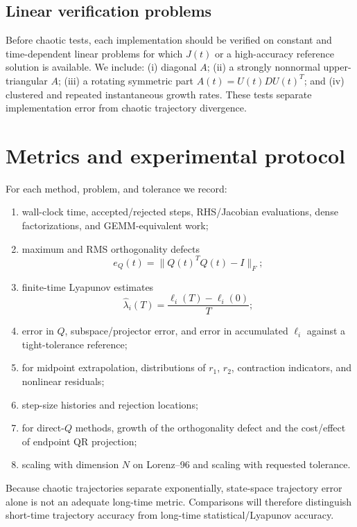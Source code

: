 \documentclass[11pt]{article}
\begin{document}
\subsection{Linear verification problems}
Before chaotic tests, each implementation should be verified on constant and time-dependent linear problems for which $J(t)$ or a high-accuracy reference solution is available. We include: (i) diagonal $A$; (ii) a strongly nonnormal upper-triangular $A$; (iii) a rotating symmetric part $A(t)=U(t)DU(t)^T$; and (iv) clustered and repeated instantaneous growth rates. These tests separate implementation error from chaotic trajectory divergence.

\section{Metrics and experimental protocol}
For each method, problem, and tolerance we record:
\begin{enumerate}
 \item wall-clock time, accepted/rejected steps, RHS/Jacobian evaluations, dense factorizations, and GEMM-equivalent work;
 \item maximum and RMS orthogonality defects
 \begin{equation}
 e_Q(t)=\|Q(t)^TQ(t)-I\|_F;
 \label{eq:orthmetric}
 \end{equation}
 \item finite-time Lyapunov estimates
 \begin{equation}
 \widehat\lambda_i(T)=\frac{\ell_i(T)-\ell_i(0)}{T};
 \label{eq:lemetric}
 \end{equation}
 \item error in $Q$, subspace/projector error, and error in accumulated $\ell_i$ against a tight-tolerance reference;
 \item for midpoint extrapolation, distributions of $r_1$, $r_2$, contraction indicators, and nonlinear residuals;
 \item step-size histories and rejection locations;
 \item for direct-$Q$ methods, growth of the orthogonality defect and the cost/effect of endpoint QR projection;
 \item scaling with dimension $N$ on Lorenz--96 and scaling with requested tolerance.
\end{enumerate}
Because chaotic trajectories separate exponentially, state-space trajectory error alone is not an adequate long-time metric. Comparisons will therefore distinguish short-time trajectory accuracy from long-time statistical/Lyapunov accuracy.
\end{document}
